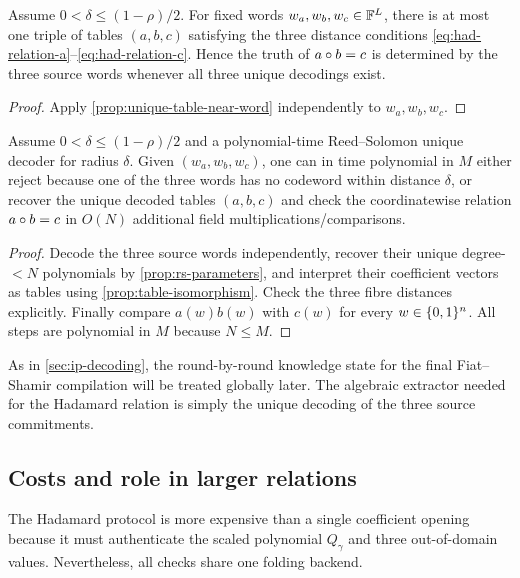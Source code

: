 \begin{proposition}
\label{prop:had-witness-unique}
Assume $0<\delta\le(1-\rho)/2$.  For fixed words $w_a,w_b,w_c\in\mathbb{F}^L$, there is at most one triple of tables $(a,b,c)$ satisfying the three distance conditions \eqref{eq:had-relation-a}--\eqref{eq:had-relation-c}.  Hence the truth of $a\circ b=c$ is determined by the three source words whenever all three unique decodings exist.
\end{proposition}

\begin{proof}
Apply \cref{prop:unique-table-near-word} independently to $w_a,w_b,w_c$.
\end{proof}

\begin{proposition}
\label{prop:had-decoding-extractor}
Assume $0<\delta\le(1-\rho)/2$ and a polynomial-time Reed--Solomon unique decoder for radius $\delta$.  Given $(w_a,w_b,w_c)$, one can in time polynomial in $M$ either reject because one of the three words has no codeword within distance $\delta$, or recover the unique decoded tables $(a,b,c)$ and check the coordinatewise relation $a\circ b=c$ in $O(N)$ additional field multiplications/comparisons.
\end{proposition}

\begin{proof}
Decode the three source words independently, recover their unique degree-$<N$ polynomials by \cref{prop:rs-parameters}, and interpret their coefficient vectors as tables using \cref{prop:table-isomorphism}.  Check the three fibre distances explicitly.  Finally compare $a(w)b(w)$ with $c(w)$ for every $w\in\{0,1\}^n$.  All steps are polynomial in $M$ because $N\le M$.
\end{proof}

As in \cref{sec:ip-decoding}, the round-by-round knowledge state for the final Fiat--Shamir compilation will be treated globally later.  The algebraic extractor needed for the Hadamard relation is simply the unique decoding of the three source commitments.

\subsection{Costs and role in larger relations}
\label{sec:hadamard-costs}

The Hadamard protocol is more expensive than a single coefficient opening because it must authenticate the scaled polynomial $Q_\gamma$ and three out-of-domain values.  Nevertheless, all checks share one folding backend.

